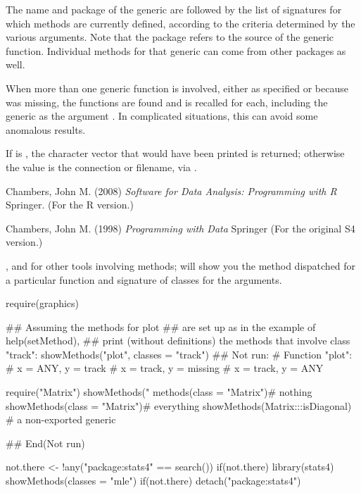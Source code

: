 %
\begin{Details}\relax
The name and package of the generic are followed by the list of
signatures for which methods are currently defined, according to the
criteria determined by the various arguments.  Note that the package
refers to the source of the generic function.  Individual methods
for that generic can come from other packages as well.

When more than one generic function is involved, either as specified or
because  was missing, the functions are found and
 is recalled for each, including the generic as the
argument .  In complicated situations, this can avoid some
anomalous results.
\end{Details}
%
\begin{Value}
If  is , the character vector that would
have been printed is returned; otherwise the value is the connection
or filename, via .
\end{Value}
%
\begin{References}\relax
Chambers, John M. (2008)
\emph{Software for Data Analysis: Programming with R}
Springer.  (For the R version.)

Chambers, John M. (1998)
\emph{Programming with Data}
Springer (For the original S4 version.)
\end{References}
%
\begin{SeeAlso}\relax
{}, and 
for other tools involving methods;
 will show you the method dispatched for a
particular function and signature of classes for the arguments.
\end{SeeAlso}
%
\begin{Examples}
\begin{ExampleCode}
require(graphics)

## Assuming the methods for plot
## are set up as in the example of help(setMethod),
## print (without definitions) the methods that involve class "track":
showMethods("plot", classes = "track")
## Not run: 
# Function "plot":
# x = ANY, y = track
# x = track, y = missing
# x = track, y = ANY

require("Matrix")
showMethods("%
    methods(class = "Matrix")# nothing
showMethods(class = "Matrix")# everything
showMethods(Matrix:::isDiagonal) # a non-exported generic

## End(Not run)




not.there <- !any("package:stats4" == search())
if(not.there) library(stats4)
showMethods(classes = "mle")
if(not.there) detach("package:stats4")
\end{ExampleCode}
\end{Examples}
